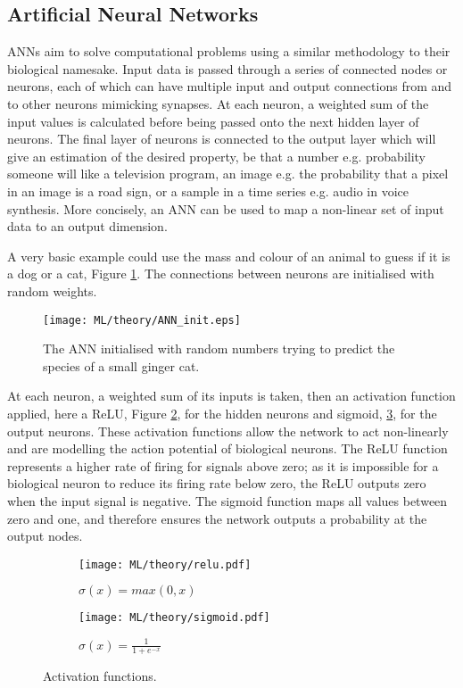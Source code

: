 \subsection{Artificial Neural Networks}
\acp{ANN} aim to solve computational problems using a similar methodology to their biological namesake. Input data is passed through a series of connected nodes or neurons, each of which can have multiple input and output connections from and to other neurons mimicking synapses. At each neuron, a weighted sum of the input values is calculated before being passed onto the next hidden layer of neurons. The final layer of neurons is connected to the output layer which will give an estimation of the desired property, be that a number e.g. probability someone will like a television program, an image e.g. the probability that a pixel in an image is a road sign, or a sample in a time series e.g. audio in voice synthesis. More concisely, an \ac{ANN} can be used to map a non-linear set of input data to an output dimension.

A very basic example could use the mass and colour of an animal to guess if it is a dog or a cat, Figure \ref{fig:ml_theory_init}. The connections between neurons are initialised with random weights. 

\begin{figure}[H]
	\centering
	\texttt{[image: ML/theory/ANN\_init.eps]}
	\caption{The \ac{ANN} initialised with random numbers trying to predict the species of a small ginger cat.}
	\label{fig:ml_theory_init}	
\end{figure}

At each neuron, a weighted sum of its inputs is taken, then an activation function applied, here a \ac{ReLU}, Figure \ref{fig:ml_theory_activation_relu}, for the hidden neurons and sigmoid, \ref{fig:ml_theory_activation_sigmoid}, for the output neurons. These activation functions allow the network to act non-linearly and are modelling the action potential of biological neurons. The \ac{ReLU} function represents a higher rate of firing for signals above zero; as it is impossible for a biological neuron to reduce its firing rate below zero, the \ac{ReLU} outputs zero when the input signal is negative. The sigmoid function maps all values between zero and one, and therefore ensures the network outputs a probability at the output nodes.

\begin{figure}[H]
	\centering
	\begin{subfigure}[c]{0.47\textwidth}
		\centering
		\texttt{[image: ML/theory/relu.pdf]}
		\caption{$\sigma (x) = max(0, x)$}
		\label{fig:ml_theory_activation_relu}
	\end{subfigure}
	\hfill
	\begin{subfigure}[c]{0.47\textwidth}
		\centering
		\texttt{[image: ML/theory/sigmoid.pdf]}
		\caption{$\sigma(x) = \frac{1}{1 + e^{-x}}$}
		\label{fig:ml_theory_activation_sigmoid}
	\end{subfigure}
	\caption{Activation functions.}
	\label{fig:ml_theory_activation}
\end{figure}

